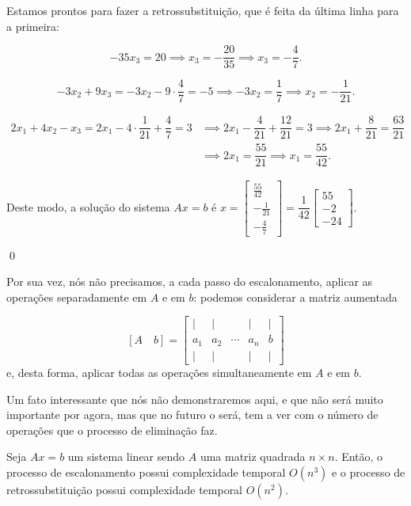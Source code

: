 \begin{Example}
	Estamos prontos para fazer a retrossubstituição, que é feita da última linha para a primeira:
	
	$$
	-35x_3 = 20 \implies x_3 = -\dfrac{20}{35} \implies x_3 = -\dfrac{4}{7}.
	$$
	
	$$
	-3x_2 + 9x_3 = -3x_2 - 9\cdot\dfrac{4}{7} = -5 \implies -3x_2 = \dfrac{1}{7} \implies x_2 = -\dfrac{1}{21}.
	$$
	
	\begin{align*}
	2x_1 + 4x_2 - x_3 = 2x_1 - 4\cdot\dfrac{1}{21} + \dfrac{4}{7} = 3 &\implies 2x_1 - \dfrac{4}{21} + \dfrac{12}{21} = 3 \implies 2x_1 + \dfrac{8}{21} = \dfrac{63}{21}\\ &\implies 2x_1 = \dfrac{55}{21} \implies x_1 = \dfrac{55}{42}.
	\end{align*}
	
	Deste modo, a solução do sistema $Ax = b$ é $x = \begin{bmatrix}
		\frac{55}{42} \\
		-\frac{1}{21} \\
		-\frac{4}{7}
	\end{bmatrix} = \dfrac{1}{42}\begin{bmatrix}
		55 \\
		-2 \\
		-24
	\end{bmatrix}$.
	
	\qed
\end{Example}

Por sua vez, nós não precisamos, a cada passo do escalonamento, aplicar as operações separadamente em $A$ e em $b$: podemos considerar a matriz aumentada

$$
[A \quad b] = \begin{bmatrix}
	| & | & & | & | \\
	a_1 & a_2 & \cdots & a_n & b \\
	| & | & & | & |
\end{bmatrix}
$$
e, desta forma, aplicar todas as operações simultaneamente em $A$ e em $b$.

Um fato interessante que nós não demonstraremos aqui, e que não será muito importante por agora, mas que no futuro o será, tem a ver com o número de operações que o processo de eliminação faz.

\begin{Theorem}
	Seja $Ax = b$ um sistema linear sendo $A$ uma matriz quadrada $n\times n$. Então, o processo de escalonamento possui complexidade temporal $O(n^3)$ e o processo de retrossubstituição possui complexidade temporal $O(n^2)$.
\end{Theorem}

